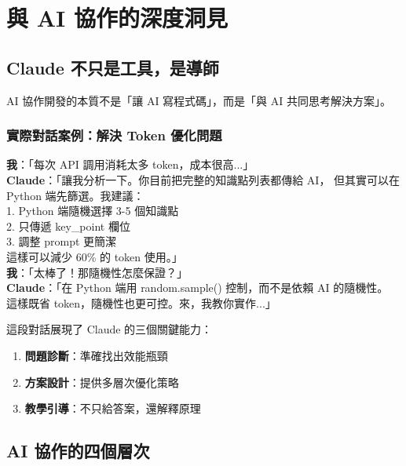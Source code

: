 \documentclass[11pt,a4paper]{article}
\begin{document}
\section{與 AI 協作的深度洞見}

\subsection{Claude 不只是工具，是導師}

\begin{insight}
AI 協作開發的本質不是「讓 AI 寫程式碼」，而是「與 AI 共同思考解決方案」。
\end{insight}

\subsubsection{實際對話案例：解決 Token 優化問題}

\begin{dialogue}
\textbf{我}：「每次 API 調用消耗太多 token，成本很高...」\\[3pt]
\textbf{Claude}：「讓我分析一下。你目前把完整的知識點列表都傳給 AI，
但其實可以在 Python 端先篩選。我建議：\\
1. Python 端隨機選擇 3-5 個知識點\\
2. 只傳遞 key\_point 欄位\\
3. 調整 prompt 更簡潔\\
這樣可以減少 60\% 的 token 使用。」\\[3pt]
\textbf{我}：「太棒了！那隨機性怎麼保證？」\\[3pt]
\textbf{Claude}：「在 Python 端用 random.sample() 控制，而不是依賴 AI 的隨機性。
這樣既省 token，隨機性也更可控。來，我教你實作...」
\end{dialogue}

這段對話展現了 Claude 的三個關鍵能力：
\begin{enumerate}
  \item \textbf{問題診斷}：準確找出效能瓶頸
  \item \textbf{方案設計}：提供多層次優化策略  
  \item \textbf{教學引導}：不只給答案，還解釋原理
\end{enumerate}

\subsection{AI 協作的四個層次}
\end{document}

